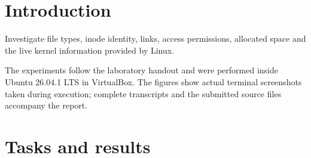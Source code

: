 \documentclass{tum_report}
\begin{document}

\tableofcontents
\thispagestyle{empty}
\clearpage
\chapter{Introduction}
Investigate file types, inode identity, links, access permissions, allocated space and the live kernel information provided by Linux.

The experiments follow the laboratory handout and were performed inside Ubuntu 26.04.1 LTS in VirtualBox. The figures show actual terminal screenshots taken during execution; complete transcripts and the submitted source files accompany the report.
\chapter{Tasks and results}

\clearpage

\par\vspace{0.8cm}

\end{document}
